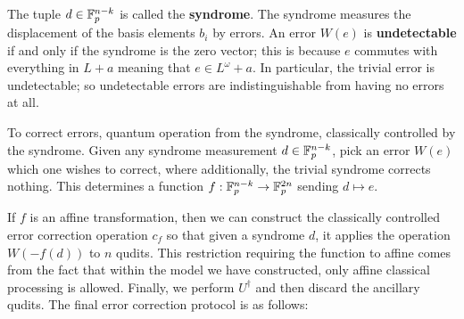 The tuple $d \in \mathbb{F}_p^{n-k}$ is called the {\bf syndrome}. The syndrome measures the displacement of the basis elements $b_i$ by errors.
An error $W(e)$ is {\bf undetectable} if and only if the syndrome is the zero vector; this is because $e$ commutes with everything in $L+a$ meaning that $e \in L^\omega+a$.  In particular, the trivial error is undetectable; so undetectable errors are indistinguishable from having no errors at all.

To correct errors,  quantum operation from the syndrome, classically controlled by the syndrome.
Given any syndrome measurement $d\in \mathbb{F}_p^{n-k}$, pick an error $W(e)$ which one wishes to correct, where additionally, the trivial syndrome corrects nothing.  This determines a function $f:\mathbb{F}_p^{n-k}\to\mathbb{F}_p^{2n}$ sending $d\mapsto e$.


If $f$ is an affine transformation, then we can construct the classically controlled error correction operation $c_f$ so that given a syndrome $d$, it applies the operation $W(-f(d))$ to $n$ qudits.  This restriction requiring the function to affine comes from the fact that within the model we have constructed, only affine classical processing is allowed. Finally, we perform $U^\dag$ and then discard the ancillary qudits. The final error correction protocol is as follows:
